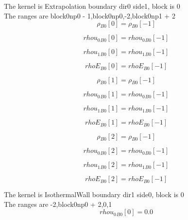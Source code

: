 \documentclass{article}
\begin{document}
\noindent The kernel is Extrapolation boundary dir0 side1, block is 0\\\noindent The ranges are block0np0 - 1,block0np0,-2,block0np1 + 2\\\begin{dmath}{\rho{_{B0}}}[{0}] = {\rho{_{B0}}}[{-1}]\end{dmath}

\begin{dmath}{rhou_{0}{_{B0}}}[{0}] = {rhou_{0}{_{B0}}}[{-1}]\end{dmath}

\begin{dmath}{rhou_{1}{_{B0}}}[{0}] = {rhou_{1}{_{B0}}}[{-1}]\end{dmath}

\begin{dmath}{rhoE{_{B0}}}[{0}] = {rhoE{_{B0}}}[{-1}]\end{dmath}

\begin{dmath}{\rho{_{B0}}}[{1}] = {\rho{_{B0}}}[{-1}]\end{dmath}

\begin{dmath}{rhou_{0}{_{B0}}}[{1}] = {rhou_{0}{_{B0}}}[{-1}]\end{dmath}

\begin{dmath}{rhou_{1}{_{B0}}}[{1}] = {rhou_{1}{_{B0}}}[{-1}]\end{dmath}

\begin{dmath}{rhoE{_{B0}}}[{1}] = {rhoE{_{B0}}}[{-1}]\end{dmath}

\begin{dmath}{\rho{_{B0}}}[{2}] = {\rho{_{B0}}}[{-1}]\end{dmath}

\begin{dmath}{rhou_{0}{_{B0}}}[{2}] = {rhou_{0}{_{B0}}}[{-1}]\end{dmath}

\begin{dmath}{rhou_{1}{_{B0}}}[{2}] = {rhou_{1}{_{B0}}}[{-1}]\end{dmath}

\begin{dmath}{rhoE{_{B0}}}[{2}] = {rhoE{_{B0}}}[{-1}]\end{dmath}

\noindent The kernel is IsothermalWall boundary dir1 side0, block is 0\\\noindent The ranges are -2,block0np0 + 2,0,1\\\begin{dmath}{rhou_{0}{_{B0}}}[{0}] = 0.0\end{dmath}
\end{document}
